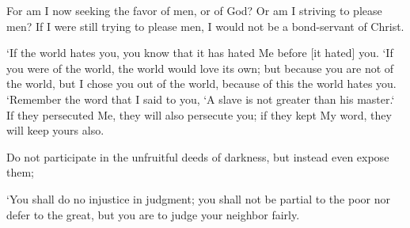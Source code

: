 \vspace{2\baselineskip}

\begin{scripture}[Galatians 1:10]
    For am I now seeking the favor of men, or of God? Or am I striving to please men? If I were still trying to please men, I would not be a bond-servant of Christ.
\end{scripture}

\vspace{2\baselineskip}

\begin{scripture}[John 15:18-20]
    `If the world hates you, you know that it has hated Me before [it hated] you.
    `If you were of the world, the world would love its own; but because you are not of the world, but I chose you out of the world, because of this the world hates you.
    `Remember the word that I said to you, `A slave is not greater than his master.` If they persecuted Me, they will also persecute you; if they kept My word, they will keep yours also.
\end{scripture}

\vspace{2\baselineskip}

\begin{scripture}[Ephesians 5:11]
    Do not participate in the unfruitful deeds of darkness, but instead even expose them;
\end{scripture}

\vspace{2\baselineskip}

\begin{scripture}[Leviticus 19:15]
    `You shall do no injustice in judgment; you shall not be partial to the poor nor defer to the great, but you are to judge your neighbor fairly.
\end{scripture}
